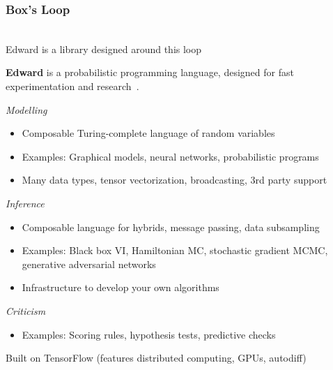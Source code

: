 \documentclass[10pt]{beamer}
\begin{document}
\begin{frame}
\frametitle{Box's Loop}
\center
{} \\
\vspace{20pt}
Edward is a library designed around this loop \\
\citep{box_science_1976-1, box_sampling_1980-1, david_m._blei_build_2014}
\end{frame}


\begin{frame}
\vspace{3ex}
\textbf{Edward} is a probabilistic programming language,
designed for fast experimentation and research~\citep{tran_deep_2017}.

\emph{Modelling}
\begin{itemize}
\item Composable Turing-complete language of random variables
\item Examples: Graphical models, neural networks, probabilistic programs
\item Many data types, tensor vectorization, broadcasting, 3rd party support
\end{itemize}

\emph{Inference}
\begin{itemize}
\item Composable language for hybrids, message passing, data subsampling
\item Examples: Black box VI, Hamiltonian MC, stochastic gradient MCMC,
  generative adversarial networks
\item Infrastructure to develop your own algorithms
\end{itemize}

\emph{Criticism}
\begin{itemize}
\item Examples: Scoring rules, hypothesis tests, predictive checks
\end{itemize}

\vspace{1ex}
Built on TensorFlow (features distributed computing, GPUs, autodiff)
\end{frame}
\end{document}
